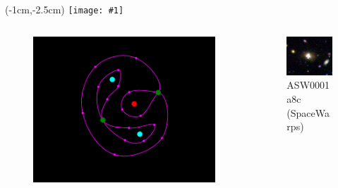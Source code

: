 \documentclass{beamer}
\newcommand{\imgframe}[1]{%
  \begin{frame}%
	\begin{textblock*}{0cm}(-1cm,-2.5cm)%
      \texttt{[image: \#1]}%
	\end{textblock*}%
  \end{frame}%
}
\begin{document}
\imgframe{imgs/fig1}

\begin{frame}
  \begin{columns}[T]
    \begin{column}{5.5cm}
      \begin{figure}
        \includegraphics[width=\textwidth]{imgs/sl-1}
      \end{figure}
    \end{column}
    \begin{column}{5.5cm}
      \begin{figure}
        \includegraphics[width=\textwidth]{imgs/real1}
        \caption{ASW0001a8c (SpaceWarps)}
      \end{figure}
    \end{column}
  \end{columns}
\end{frame}
\end{document}
